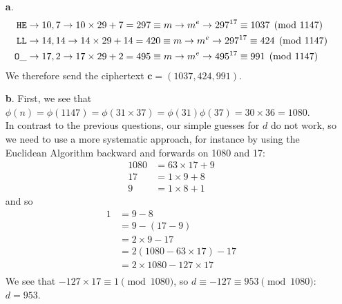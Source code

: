 \documentclass[11pt]{article}
\renewcommand{\vec}[1]{\mathbf{#1}}
\begin{document}
\bigskip{}
\begin{itemize}
  \item[{\bf a}.]
    \begin{align*}
      {\tt HE}  & \to 10, 7\to 10\times 29 +  7 = 297\equiv m \to m^e \to 297^{17} \equiv  1037\pmod{1147}\\
      {\tt LL}  & \to 14,14\to 14\times 29 + 14 = 420\equiv m \to m^e \to 297^{17} \equiv   424\pmod{1147}\\
      {\tt O\_} & \to 17, 2\to 17\times 29 +  2 = 495\equiv m \to m^e \to 495^{17} \equiv   991\pmod{1147}\\
    \end{align*}
    We therefore send the ciphertext $\vec{c} = (1037,424,991)$.
  \item[{\bf b}.]
    First, we see that $\phi(n) = \phi(1147) = \phi(31\times 37) = \phi(31)\phi(37) = 30\times 36 = 1080$.\\
    In contrast to the previous questions,
    our simple guesses for $d$ do not work,
    so we need to use a more systematic approach,
    for instance by using the Euclidean Algorithm backward and forwards on 1080 and 17:
    \begin{align*}
      1080 &= 63\times 17 + 9\\
        17 &=  1\times 9  + 8\\
         9 &=  1\times 8  + 1
    \end{align*}
    and so
    \begin{align*}
         1 &=  9 - 8\\
           &=  9 - (17 - 9)\\
           &= 2\times 9 - 17\\
           &= 2(1080 - 63\times 17) - 17\\
           &= 2\times 1080 - 127\times 17\\
    \end{align*}
    We see that $-127\times 17\equiv 1\pmod{1080}$,
    so $d \equiv -127 \equiv 953\pmod{1080}$: \, $d = 953$.
\end{itemize}
\end{document}
